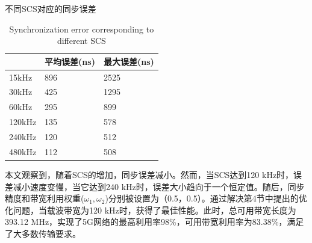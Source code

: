 \documentclass[UTF8,a4paper,12pt]{ctexart}
\numberwithin{equation}{section}
\begin{document}
	\begin{table}[!htb]
		\centering
		\caption{不同SCS对应的同步误差}
		\vspace{-10pt}
		\caption{Synchronization error corresponding to different SCS}
		\label{tab1}
		\begin{tabular}{l|l|l}
			\hline
			& \textbf{平均误差(ns)}& \textbf{最大误差(ns)} \\
			\hline
			15kHz 
			& 896
			& 2525 \\
			\hline
			30kHz
			& 425
			& 1295 \\
			\hline
			60kHz
			& 295
			& 899 \\
			\hline
			120kHz
			& 135
			& 578 \\
			\hline
			240kHz
			& 120
			& 512 \\
			\hline
			480kHz
			& 112
			& 508 \\
			\hline
		\end{tabular}
	\end{table}
	
	
	本文观察到，随着SCS的增加，同步误差减小。然而，当SCS达到120 kHz时，误差减小速度变慢，当它达到240 kHz时，误差大小趋向于一个恒定值。随后，同步精度和带宽利用权重($\omega_1,\omega_2$)分别被设置为（0.5，0.5）。通过解决第4节中提出的优化问题，当载波带宽为120 kHz时，获得了最佳性能。此时，总可用带宽长度为393.12 MHz，实现了5G网络的最高利用率98\%，可用带宽利用率为83.38\%，满足了大多数传输要求。
	
\end{document}
